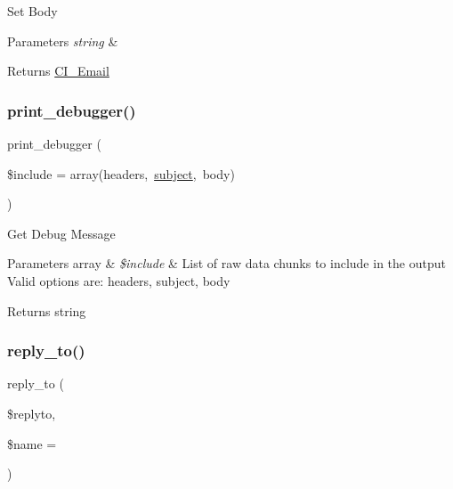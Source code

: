 Set Body


\begin{DoxyParams}{Parameters}
{\em string} & \\
\hline
\end{DoxyParams}
\begin{DoxyReturn}{Returns}
\mbox{\hyperlink{class_c_i___email}{C\+I\+\_\+\+Email}} 
\end{DoxyReturn}
\mbox{\label{class_c_i___email_a11f22e40cb1409ee7569c0abc15fae09}} 
\subsubsection{\texorpdfstring{print\+\_\+debugger()}{print\_debugger()}}
{\footnotesize\ttfamily print\+\_\+debugger (\begin{DoxyParamCaption}\item[{}]{\$include = {\ttfamily array(\textquotesingle{}headers\textquotesingle{},~\textquotesingle{}\mbox{\hyperlink{class_c_i___email_aaa61b3aaa6cc4c90e26686e4bf41587a}{subject}}\textquotesingle{},~\textquotesingle{}body\textquotesingle{})} }\end{DoxyParamCaption})}

Get Debug Message


\begin{DoxyParams}[1]{Parameters}
array & {\em \$include} & List of raw data chunks to include in the output Valid options are\+: \textquotesingle{}headers\textquotesingle{}, \textquotesingle{}subject\textquotesingle{}, \textquotesingle{}body\textquotesingle{} \\
\hline
\end{DoxyParams}
\begin{DoxyReturn}{Returns}
string 
\end{DoxyReturn}
\mbox{\label{class_c_i___email_a1ee2303dece90d5b3afbb5dc75b9a0ca}} 
\subsubsection{\texorpdfstring{reply\+\_\+to()}{reply\_to()}}
{\footnotesize\ttfamily reply\+\_\+to (\begin{DoxyParamCaption}\item[{}]{\$replyto,  }\item[{}]{\$name = {\ttfamily \textquotesingle{}\textquotesingle{}} }\end{DoxyParamCaption})}

